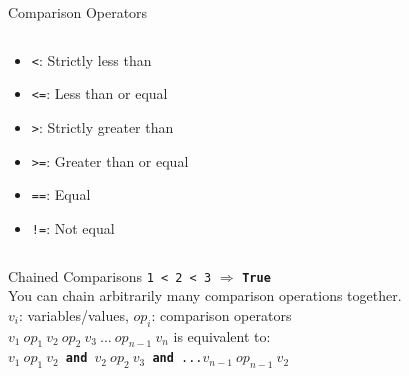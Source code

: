         \begin{frame}{Comparison Operators}
            \LARGE
            \begin{columns}
                \begin{column}{0.4\textwidth}
                    \begin{itemize}
                        \item \texttt{<}: Strictly less than
                        \pause
                        \item \texttt{<=}: Less than or equal
                        \pause
                        \item \texttt{>}: Strictly greater than
                        \pause
                        \item \texttt{>=}: Greater than or equal
                        \pause
                        \item \texttt{==}: Equal
                        \pause
                        \item \texttt{!=}: Not equal
                    \end{itemize}
                \end{column}
                \pause
                \begin{column}{0.6\textwidth}
                    \inputminted[frame=single,framesep=2pt]{python3}{code-examples/comparison.py}
                \end{column}
            \end{columns}
        \end{frame}

        \begin{frame}{Chained Comparisons}
            \LARGE  
            \texttt{1 < 2 < 3} $\Rightarrow$ 
            \pause
            \textbf{\texttt{True}}\\
            \pause
            You can chain arbitrarily many comparison operations together.\\
            \pause
            $v_{i}$: variables/values, $op_{i}$: comparison operators\\
            \pause
            \texttt{$v_{1}\ op_{1}\ v_{2}\ op_{2}\ v_{3}\ ...\ op_{n-1}\ v_{n}$} is equivalent to:\\
            \texttt{$v_{1}\ op_{1}\ v_{2}$ \textbf{and} $v_{2}\ op_{2}\ v_{3}$ \textbf{and} ...$v_{n-1}\ op_{n-1}\ v_{2}$}\\
            \pause
            \vspace{-4mm}
            \inputminted[frame=single,framesep=2pt]{python3}{code-examples/chained.py}
        \end{frame}

